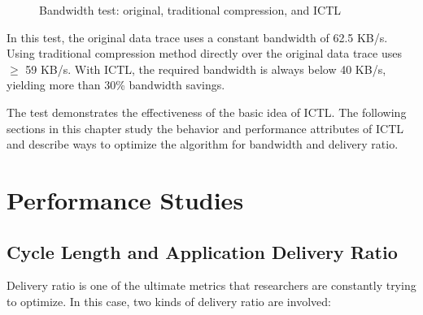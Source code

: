 \documentclass[12pt]{report}
\begin{document}
\begin{figure}[h]
  \caption{\label{fig:first_glance}Bandwidth test: original, traditional compression, and ICTL }
\end{figure}

In this test, the original data trace uses a constant bandwidth of 62.5 KB/s. Using traditional compression method directly over the original data trace uses $\ge$ 59 KB/s. With ICTL, the required bandwidth is always below 40 KB/s, yielding more than 30\% bandwidth savings.

The test demonstrates the effectiveness of the basic idea of ICTL. The following sections in this chapter study the behavior and performance attributes of ICTL and describe ways to optimize the algorithm for bandwidth and delivery ratio.


\section{Performance Studies}

\subsection{Cycle Length and Application Delivery Ratio}
\label{sec:cl_adr}

Delivery ratio is one of the ultimate metrics that researchers are constantly trying to optimize. In this case, two kinds of delivery ratio are involved:
\end{document}
